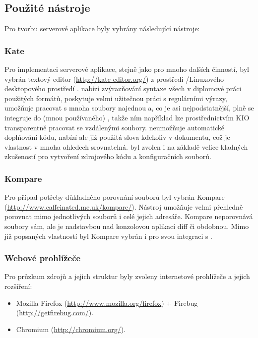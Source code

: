\subsection{Použité nástroje}
Pro tvorbu serverové aplikace byly vybrány následující nástroje:
\subsubsection{Kate}
Pro implementaci serverové aplikace, stejně jako pro mnoho dalších činností, byl vybrán textový editor  (\url{http://kate-editor.org/}) z prostředí /Linuxového desktopového prostředí .  nabízí zvýrazňování syntaxe všech v diplomové práci použitých formátů, poskytuje velmi užitečnou práci s regulárními výrazy, umožňuje pracovat s mnoha soubory najednou a, co je asi nejpodstatnější, plně se integruje do (mnou používaného) , takže ním například lze prostřednictvím \gls{KIO} transparentně pracovat se vzdálenými soubory.  neumožňuje automatické doplňování kódu, nabízí ale již použitá slova kdekoliv v dokumentu, což je vlastnost v mnoha ohledech srovnatelná.  byl zvolen i na základě velice kladných zkušeností pro vytvoření zdrojového kódu a konfiguračních souborů.

\subsubsection{Kompare}
Pro případ potřeby důkladného porovnání souborů byl vybrán Kompare (\url{http://www.caffeinated.me.uk/kompare/}). Nástroj umožňuje velmi přehledně porovnat mimo jednotlivých souborů i celé jejich adresáře. Kompare neporovnává soubory sám, ale je nadstavbou nad konzolovou aplikací diff či obdobnou. Mimo již popsaných vlastností byl Kompare vybrán i pro svou integraci s .

\subsubsection{Webové prohlížeče}
Pro průzkum zdrojů a jejich struktur byly zvoleny internetové prohlížeče a jejich rozšíření:
\begin{itemize}
 \item Mozilla Firefox (\url{http://www.mozilla.org/firefox}) + Firebug (\url{http://getfirebug.com/}).
 \item Chromium (\url{http://chromium.org/}).
\end{itemize}

